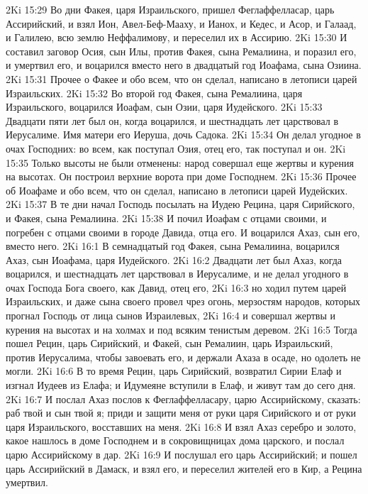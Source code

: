 \vs 2Ki 15:29 Во дни Факея, царя Израильского, пришел Феглаффелласар, царь Ассирийский, и взял Ион, Авел-Беф-Мааху, и Ианох, и Кедес, и Асор, и Галаад, и Галилею, всю землю Неффалимову, и переселил их в Ассирию.
\vs 2Ki 15:30 И составил заговор Осия, сын Илы, против Факея, сына Ремалиина, и поразил его, и умертвил его, и воцарился вместо него в двадцатый год Иоафама, сына Озиина.
\rsbpar\vs 2Ki 15:31 Прочее о Факее и обо всем, что он сделал, написано в летописи царей Израильских.
\rsbpar\vs 2Ki 15:32 Во второй год Факея, сына Ремалиина, царя Израильского, воцарился Иоафам, сын Озии, царя Иудейского.
\vs 2Ki 15:33 Двадцати пяти лет был он, когда воцарился, и шестнадцать лет царствовал в Иерусалиме. Имя матери его Иеруша, дочь Садока.
\vs 2Ki 15:34 Он делал угодное в очах Господних: во всем, как поступал Озия, отец его, так поступал и он.
\vs 2Ki 15:35 Только высоты не были отменены: народ совершал еще жертвы и курения на высотах. Он построил верхние ворота при доме Господнем.
\rsbpar\vs 2Ki 15:36 Прочее об Иоафаме и обо всем, что он сделал, написано в летописи царей Иудейских.
\vs 2Ki 15:37 В те дни начал Господь посылать на Иудею Рецина, царя Сирийского, и Факея, сына Ремалиина.
\vs 2Ki 15:38 И почил Иоафам с отцами своими, и погребен с отцами своими в городе Давида, отца его. И воцарился Ахаз, сын его, вместо него.
\vs 2Ki 16:1 В семнадцатый год Факея, сына Ремалиина, воцарился Ахаз, сын Иоафама, царя Иудейского.
\vs 2Ki 16:2 Двадцати лет был Ахаз, когда воцарился, и шестнадцать лет царствовал в Иерусалиме, и не делал угодного в очах Господа Бога своего, как Давид, отец его,
\vs 2Ki 16:3 но ходил путем царей Израильских, и даже сына своего провел чрез огонь,  мерзостям народов, которых прогнал Господь от лица сынов Израилевых,
\vs 2Ki 16:4 и совершал жертвы и курения на высотах и на холмах и под всяким тенистым деревом.
\vs 2Ki 16:5 Тогда пошел Рецин, царь Сирийский, и Факей, сын Ремалиин, царь Израильский, против Иерусалима, чтобы завоевать его, и держали Ахаза в осаде, но одолеть не могли.
\vs 2Ki 16:6 В то время Рецин, царь Сирийский, возвратил Сирии Елаф и изгнал Иудеев из Елафа; и Идумеяне вступили в Елаф, и живут там до сего дня.
\vs 2Ki 16:7 И послал Ахаз послов к Феглаффелласару, царю Ассирийскому, сказать: раб твой и сын твой я; приди и защити меня от руки царя Сирийского и от руки царя Израильского, восставших на меня.
\vs 2Ki 16:8 И взял Ахаз серебро и золото, какое нашлось в доме Господнем и в сокровищницах дома царского, и послал царю Ассирийскому в дар.
\vs 2Ki 16:9 И послушал его царь Ассирийский; и пошел царь Ассирийский в Дамаск, и взял его, и переселил жителей его в Кир, а Рецина умертвил.
